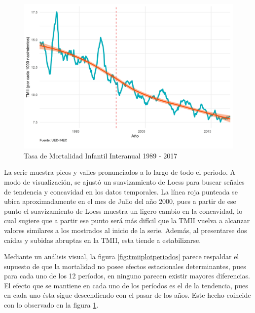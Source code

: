 \documentclass[
]{article}
\begin{document}
\begin{figure}[!h]
\includegraphics[width=1\linewidth,height=1\textheight]{Tesis_files/figure-latex/tmiiplotgeneral-1} \caption{Tasa de Mortalidad Infantil Interanual 1989 - 2017}\label{fig:tmiiplotgeneral}
\end{figure}

La serie muestra picos y valles pronunciados a lo largo de todo el
periodo. A modo de visualización, se ajustó un suavizamiento de Loess
para buscar señales de tendencia y concavidad en los datos temporales.
La línea roja punteada se ubica aproximadamente en el mes de Julio del
año 2000, pues a partir de ese punto el suavizamiento de Loess muestra
un ligero cambio en la concavidad, lo cual sugiere que a partir ese
punto será más difícil que la TMII vuelva a alcanzar valores similares a
los mostrados al inicio de la serie. Además, al presentarse dos caídas y
subidas abruptas en la TMII, esta tiende a estabilizarse.

Mediante un análisis visual, la figura \ref{fig:tmiiplotperiodos} parece
respaldar el supuesto de que la mortalidad no posee efectos estacionales
determinantes, pues para cada uno de los 12 períodos, en ninguno parecen
existir mayores diferencias. El efecto que se mantiene en cada uno de
los períodos es el de la tendencia, pues en cada uno ésta sigue
descendiendo con el pasar de los años. Este hecho coincide con lo
observado en la figura \ref{fig:tmiiplotgeneral}.
\end{document}
